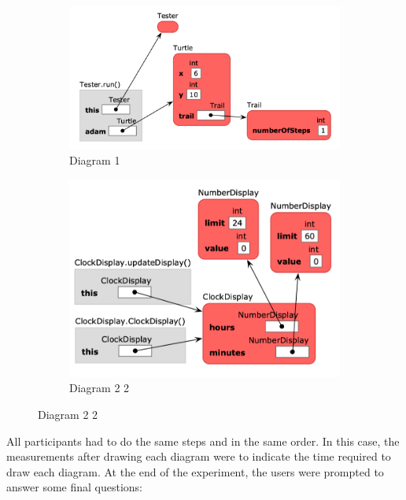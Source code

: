 \documentclass[]{usiinfbachelorproject}
\begin{document}
\begin{figure}[h!]
\centering
\begin{subfigure}{.5\textwidth}
  \centering
  \includegraphics[width=\textwidth-10pt]{figures/informa_clicker_example2.png}
  \caption{Diagram 1}
\end{subfigure}%
\begin{subfigure}{.5\textwidth}
  \centering
  \includegraphics[width=\textwidth-10pt]{figures/informa_clicker_example4.png}
  \caption{Diagram 2 2}
\end{subfigure}
\label{fig:test}
\end{figure}


\noindent All participants had to do the same steps and in the same order. In this case, the measurements after drawing each diagram were to indicate the time required to draw each diagram. At the end of the experiment, the users were prompted to answer some final questions:
\end{document}
